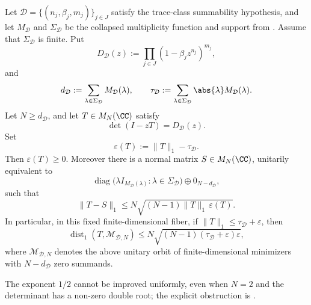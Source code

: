 \begin{theorem}
  \label{thm:finite-dimensional-trace-stability}
  Let \(\mathcal D=\{(n_j,\beta_j,m_j)\}_{j\in J}\) satisfy the trace-class
  summability hypothesis, and let \(M_{\mathcal D}\) and
  \(\Sigma_{\mathcal D}\) be the collapsed multiplicity function and support
  from . Assume that
  \(\Sigma_{\mathcal D}\) is finite. Put
  \[
    D_{\mathcal D}(z)
    :=\prod_{j\in J}(1-\beta_j z^{n_j})^{m_j},
  \]
  and
  \[
    d_{\mathcal D}
    :=\sum_{\lambda\in\Sigma_{\mathcal D}}M_{\mathcal D}(\lambda),
    \qquad
    \tau_{\mathcal D}
    :=\sum_{\lambda\in\Sigma_{\mathcal D}}
      \abs{\lambda}M_{\mathcal D}(\lambda).
  \]
  Let \(N\ge d_{\mathcal D}\), and let \(T\in M_N(\CC)\) satisfy
  \[
    \det(I-zT)=D_{\mathcal D}(z).
  \]
  Set
  \[
    \varepsilon(T):=\|T\|_1-\tau_{\mathcal D}.
  \]
  Then \(\varepsilon(T)\ge0\). Moreover there is a normal matrix
  \(S\in M_N(\CC)\), unitarily equivalent to
  \[
    \operatorname{diag}\bigl(
      \lambda I_{M_{\mathcal D}(\lambda)}:
      \lambda\in\Sigma_{\mathcal D}\bigr)\oplus0_{N-d_{\mathcal D}},
  \]
  such that
  \[
    \|T-S\|_1
    \le
    N\sqrt{(N-1)\|T\|_1\,\varepsilon(T)}.
  \]
  In particular, in this fixed finite-dimensional fiber, if
  \(\|T\|_1\le\tau_{\mathcal D}+\varepsilon\), then
  \[
    \operatorname{dist}_1(T,\mathcal M_{\mathcal D,N})
    \le
    N\sqrt{(N-1)(\tau_{\mathcal D}+\varepsilon)\varepsilon},
  \]
  where \(\mathcal M_{\mathcal D,N}\) denotes the above unitary orbit of
  finite-dimensional minimizers with \(N-d_{\mathcal D}\) zero summands.

  The exponent \(1/2\) cannot be improved uniformly, even when
  \(N=2\) and the determinant has a non-zero double root; the explicit
  obstruction is .
\end{theorem}

